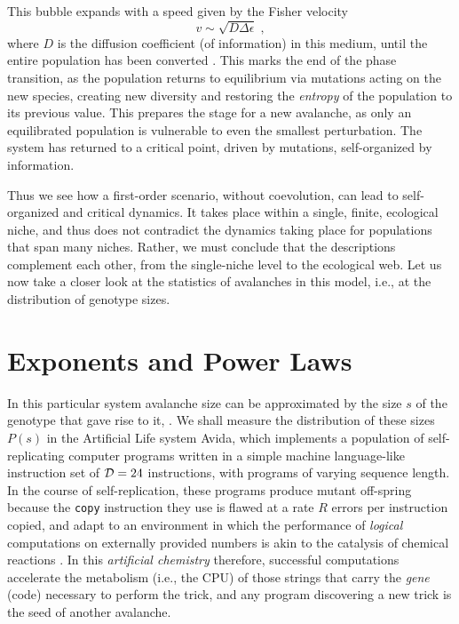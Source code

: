 \documentclass[letterpaper]{article}
\begin{document}
This bubble expands with a speed given by the Fisher velocity
\begin{equation}
    v\sim\sqrt{D\Delta\epsilon}\;, \label{eq4}
\end{equation}
where $D$ is the diffusion coefficient (of information) in this
medium, until the entire population has been converted \citep{CHU}.
This marks the end of the phase transition, as the population returns
to equilibrium via mutations acting on the new species, creating new
diversity and restoring the {\em entropy} of the population to its
previous value. This prepares the stage for a new avalanche, as only
an equilibrated population is vulnerable to even the smallest
perturbation. The system has returned to a critical point, driven by
mutations, self-organized by information.

Thus we see how a first-order scenario, without coevolution, can lead
to self-organized and critical dynamics. It takes place within a
single, finite, ecological niche, and thus does not contradict the
dynamics taking place for populations that span many niches. Rather,
we must conclude that the descriptions complement each other, from the
single-niche level to the ecological web. Let us now take a closer
look at the statistics of avalanches in this model, i.e., at the
distribution of genotype sizes.



\section{Exponents and Power Laws}
In this particular system avalanche size can be approximated
by the size $s$ of the genotype that gave rise to it,
.  We shall measure the distribution of these sizes
$P(s)$ in the Artificial Life system Avida, which implements a
population of self-replicating computer programs written in a simple
machine language-like instruction set of ${\cal D}=24$ instructions,
with programs of varying sequence length. In the course of
self-replication, these programs produce mutant off-spring because the
{\tt copy} instruction they use is flawed at a rate $R$ errors per
instruction copied, and adapt to an environment in which the
performance of {\em logical} computations on externally provided
numbers is akin to the catalysis of chemical reactions \citep{OBA}. In
this {\em artificial chemistry} therefore, successful computations
accelerate the metabolism (i.e., the CPU) of those strings that carry
the {\em gene} (code) necessary to perform the trick, and any program
discovering a new trick is the seed of another avalanche.
\end{document}
